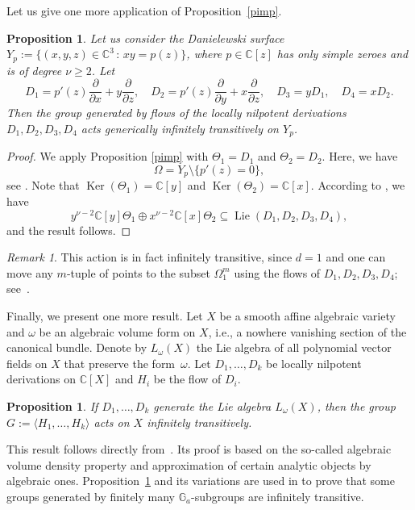 \documentclass[a4paper,draft,reqno,12pt]{amsart}
\newtheorem{proposition}[theorem]{Proposition}
\theoremstyle{definition}
\theoremstyle{remark}
\newtheorem {remark}[theorem]{Remark}
\DeclareMathOperator{\lie}{Lie}
\DeclareMathOperator{\Ker}{Ker}
\def\GG{{\mathbb G}}
\def\CC{{\mathbb C}}
\begin{document}
Let us give one more application of Proposition~\ref{pimp}. 

\begin{proposition} \label{dan}
Let us consider the Danielewski surface $Y_p := \{ (x,y,z) \in \CC^3 \,:\, xy = p(z)\}$, where $p \in \CC[z]$ has only simple zeroes and is of degree $\nu \geq 2$.
Let
$$
D_1 = p'(z) \frac{\partial}{\partial x} + y \frac{\partial}{\partial z}, \quad
D_2 = p'(z) \frac{\partial}{\partial y} + x \frac{\partial}{\partial z}, \quad
D_3 = y D_1, \quad
D_4 = x D_2.
$$
Then the group generated by flows of the locally nilpotent derivations $D_1, D_2, D_3, D_4$ acts generically infinitely transitively on $Y_p$.
\end{proposition}

\begin{proof}
We apply Proposition \ref{pimp} with $\Theta_1 = D_1$ and $\Theta_2 = D_2$. Here, we have 
\[
\Omega = Y_p \setminus \{p'(z) = 0 \},
\]
see \cite[Lemma 4.12]{An-3}. 
Note that $\Ker(\Theta_1)=\CC[y]$ and $\Ker(\Theta_2)=\CC[x]$. According to \cite[Corollary~4.6]{An-3}, we have
$$
y^{\nu-2} \CC[y] \Theta_1 \oplus x^{\nu-2} \CC[x] \Theta_2 \subseteq \lie(D_1, D_2, D_3, D_4),
$$
and the result follows. 
\end{proof}

\begin{remark}
This action is in fact infinitely transitive, since $d=1$ and one can move any $m$-tuple of points to the subset $\Omega^m_1$
using the flows of $D_1, D_2, D_3, D_4$; see~\cite[Theorem~4.11]{An-3}.
\end{remark}

\smallskip 

Finally, we present one more result. Let $X$ be a smooth affine algebraic variety and $\omega$ be an algebraic volume form on $X$, i.e., a nowhere vanishing section of the canonical bundle. Denote by $L_{\omega}(X)$ the Lie algebra of all polynomial vector fields on $X$ that preserve the form~$\omega$.  Let $D_1,\ldots, D_k$ be locally nilpotent derivations on $\CC[X]$ and $H_i$ be the flow of $D_i$.

\begin{proposition}  \label{vpp} 
If $D_1,\ldots, D_k$ generate the Lie algebra $L_{\omega}(X)$, then the group $G:=\langle H_1,\ldots, H_k\rangle$ acts on $X$ infinitely transitively.  
\end{proposition}

This result follows directly from~\cite[Corollary~8]{An-1}. Its proof is based on the so-called algebraic volume density property and approximation of certain analytic objects by algebraic ones. Proposition~\ref{vpp} and its variations are used in \cite{An-1, An-2, An-3} to prove that some groups generated by finitely many $\GG_a$-subgroups are infinitely transitive. 
\end{document}
